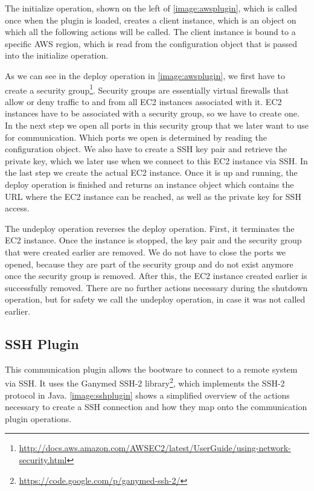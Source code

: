 The initialize operation, shown on the left of \autoref{image:awsplugin}, which is called once when the plugin is loaded, creates a client instance, which is an object on which all the following actions will be called.
The client instance is bound to a specific AWS region, which is read from the configuration object that is passed into the initialize operation.

As we can see in the deploy operation in \autoref{image:awsplugin}, we first have to create a security group\footnote{\url{http://docs.aws.amazon.com/AWSEC2/latest/UserGuide/using-network-security.html}}.
Security groups are essentially virtual firewalls that allow or deny traffic to and from all EC2 instances associated with it.
EC2 instances have to be associated with a security group, so we have to create one.
In the next step we open all ports in this security group that we later want to use for communication.
Which ports we open is determined by reading the configuration object.
We also have to create a SSH key pair and retrieve the private key, which we later use when we connect to this EC2 instance via SSH.
In the last step we create the actual EC2 instance.
Once it is up and running, the deploy operation is finished and returns an instance object which contains the URL where the EC2 instance can be reached, as well as the private key for SSH access.

The undeploy operation reverses the deploy operation.
First, it terminates the EC2 instance.
Once the instance is stopped, the key pair and the security group that were created earlier are removed.
We do not have to close the ports we opened, because they are part of the security group and do not exist anymore once the security group is removed.
After this, the EC2 instance created earlier is successfully removed.
There are no further actions necessary during the shutdown operation, but for safety we call the undeploy operation, in case it was not called earlier.

\subsection{SSH Plugin}

This communication plugin allows the bootware to connect to a remote system via SSH.
It uses the Ganymed SSH-2 library\footnote{\url{https://code.google.com/p/ganymed-ssh-2/}}, which implements the SSH-2 protocol in Java.
\autoref{image:sshplugin} shows a simplified overview of the actions necessary to create a SSH connection and how they map onto the communication plugin operations.

